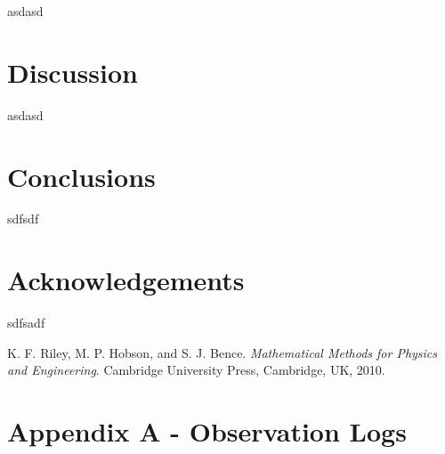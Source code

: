 \documentclass[twocolumn]{revtex4}
\begin{document}
asdasd

\vspace{-3ex}
\section{Discussion}
\vspace{-2ex}

asdasd

\vspace{-5ex}
\section{Conclusions}
\vspace{-2ex}

sdfsdf

\vspace{-5ex}
\section{Acknowledgements}
\vspace{-2ex}

sdfsadf

\begin{thebibliography}{5}
	K. F. Riley, M. P. Hobson, and S. J. Bence.
	\textit{Mathematical Methods for Physics and Engineering}.
	Cambridge University Press, Cambridge, UK, 2010.	
\end{thebibliography}
\clearpage

\vfill
\twocolumngrid
\vspace{-3ex}
\section*{Appendix A - Observation Logs}
\vspace{-2ex}



\clearpage
\end{document}
